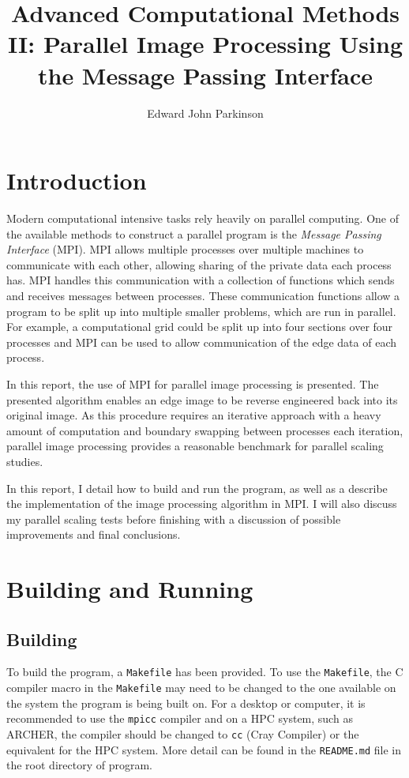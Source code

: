 \documentclass[11pt, a4paper]{article}
\begin{document}
	\title{Advanced Computational Methods II: Parallel Image Processing Using the Message Passing Interface}
	\author{Edward John Parkinson}
	\maketitle	
	
	\section{Introduction}
		Modern computational intensive tasks rely heavily on parallel computing. One of the available methods to construct a parallel program is the \textit{Message Passing Interface} (MPI). MPI allows multiple processes over multiple machines to communicate with each other, allowing sharing of the private data each process has. MPI handles this communication with a collection of functions which sends and receives messages between processes. These communication functions allow a program to be split up into multiple smaller problems, which are run in parallel. For example, a computational grid could be split up into four sections over four processes and MPI can be used to allow communication of the edge data of each process. 
		
		In this report, the use of MPI for parallel image processing is presented. The presented algorithm enables an edge image to be reverse engineered back into its original image. As this procedure requires an iterative approach with a heavy amount of computation and boundary swapping between processes each iteration, parallel image processing provides a reasonable benchmark for parallel scaling studies.
		
		In this report, I detail how to build and run the program, as well as a describe the implementation of the image processing algorithm in MPI. I will also discuss my parallel scaling tests before finishing with a discussion of possible improvements and final conclusions.
	
	\section{Building and Running}
		\subsection{Building}
			To build the program, a \texttt{Makefile} has been provided. To use the \texttt{Makefile}, the C compiler macro in the \texttt{Makefile} may need to be changed to the one available on the system the program is being built on. For a desktop or computer, it is recommended to use the \texttt{mpicc} compiler and on a HPC system, such as ARCHER, the compiler should be changed to \texttt{cc} (Cray Compiler) or the equivalent for the HPC system. More detail can be found in the \texttt{README.md} file in the root directory of program.
		
\end{document}
